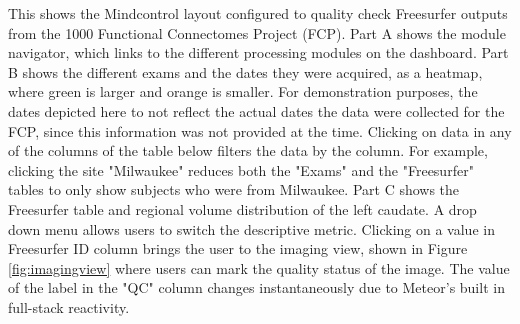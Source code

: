 \label{fig:dashboard}

This shows the Mindcontrol layout configured to quality check Freesurfer outputs from the 1000 Functional Connectomes Project (FCP). Part A shows the module navigator, which links to the different processing modules on the dashboard. Part B shows the different exams and the dates they were acquired, as a heatmap, where green is larger and orange is smaller. For demonstration purposes, the dates depicted here to not reflect the actual dates the data were collected for the FCP, since this information was not provided at the time. Clicking on data in any of the columns of the table below filters the data by the column. For example, clicking the site "Milwaukee" reduces both the "Exams" and the "Freesurfer" tables to only show subjects who were from Milwaukee. Part C shows the Freesurfer table and regional volume distribution of the left caudate. A drop down menu allows users to switch the descriptive metric. Clicking on a value in Freesurfer ID column brings the user to the imaging view, shown in Figure \ref{fig:imagingview} where users can mark the quality status of the image. The value of the label in the "QC" column changes instantaneously due to Meteor's built in full-stack reactivity. 